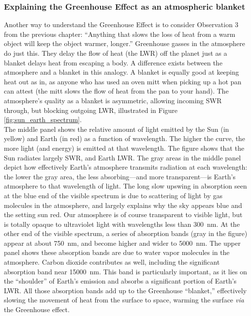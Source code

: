 \documentclass[amstex,12pt]{book}
\begin{document}
\subsubsection{Explaining the Greenhouse Effect as an atmospheric blanket}
Another way to understand the Greenhouse Effect is to consider Observation 3 from the previous chapter: ``Anything that slows the loss of heat from a warm object will keep the object warmer, longer.'' Greenhouse gasses in the atmosphere do just this. They delay the flow of heat (the LWR) off the planet just as a blanket delays heat from escaping a body. A difference exists between the atmosphere and a blanket in this analogy. A blanket is equally good at keeping heat out as in, as anyone who has used an oven mitt when picking up a hot pan can attest (the mitt slows the flow of heat from the pan to your hand). The atmosphere's quality as a blanket is asymmetric, allowing incoming SWR through, but blocking outgoing LWR, illustrated in Figure \ref{fig:sun_earth_spectrum}.\\
The middle panel shows the relative amount of light emitted by the Sun (in yellow) and Earth (in red) as a function of wavelength. The higher the curve, the more light (and energy) is emitted at that wavelength. The figure shows that the Sun radiates largely SWR, and Earth LWR. The gray areas in the middle panel depict how effectively Earth's atmosphere transmits radiation at each wavelength: the lower the gray area, the less absorbing---and more transparent---is Earth's atmosphere to that wavelength of light. The long slow upswing in absorption seen at the blue end of the visible spectrum is due to scattering of light by gas molecules in the atmosphere, and largely explains why the sky appears blue and the setting sun red. Our atmosphere is of course transparent to visible light, but is totally opaque to ultraviolet light with wavelengths less than \SI{300}{\nano\metre}. At the other end of the visible spectrum, a series of absorption bands (gray in the figure) appear at about \SI{750}{\nano\metre}, and become higher and wider to \SI{5000}{\nano\metre}. The upper panel shows these absorption bands are due to water vapor molecules in the atmosphere. Carbon dioxide contributes as well, including the significant absorption band near \SI{15000}{\nano\metre}. This band is particularly important, as it lies on the ``shoulder'' of Earth's emission and absorbs a significant portion of Earth's LWR. All those absorption bands add up to the Greenhouse ``blanket,'' effectively slowing the movement of heat from the surface to space, warming the surface \textit{via} the Greenhouse effect.\\
\end{document}
